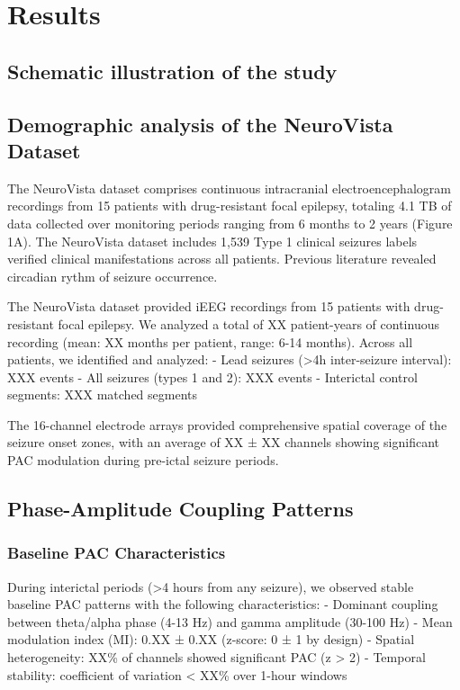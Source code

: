 \section{Results}

\subsection{Schematic illustration of the study}

\subsection{Demographic analysis of the NeuroVista Dataset}
The NeuroVista dataset \cite{kuhlmann_epilepsyecosystemorg_2018} comprises continuous intracranial electroencephalogram recordings from 15 patients with drug-resistant focal epilepsy, totaling 4.1 TB of data collected over monitoring periods ranging from 6 months to 2 years (Figure 1A). The NeuroVista dataset includes 1,539 Type 1 clinical seizures labels verified clinical manifestations across all patients. Previous literature revealed circadian rythm of seizure occurrence. \cite{}

The NeuroVista dataset provided iEEG recordings from 15 patients with drug-resistant focal epilepsy. We analyzed a total of XX patient-years of continuous recording (mean: XX months per patient, range: 6-14 months). Across all patients, we identified and analyzed:
- Lead seizures (>4h inter-seizure interval): XXX events
- All seizures (types 1 and 2): XXX events  
- Interictal control segments: XXX matched segments

The 16-channel electrode arrays provided comprehensive spatial coverage of the seizure onset zones, with an average of XX ± XX channels showing significant PAC modulation during pre-ictal seizure periods.

\subsection{Phase-Amplitude Coupling Patterns}

\subsubsection{Baseline PAC Characteristics}
During interictal periods (>4 hours from any seizure), we observed stable baseline PAC patterns with the following characteristics:
- Dominant coupling between theta/alpha phase (4-13 Hz) and gamma amplitude (30-100 Hz)
- Mean modulation index (MI): 0.XX ± 0.XX (z-score: 0 ± 1 by design)
- Spatial heterogeneity: XX\% of channels showed significant PAC (z > 2)
- Temporal stability: coefficient of variation < XX\% over 1-hour windows

